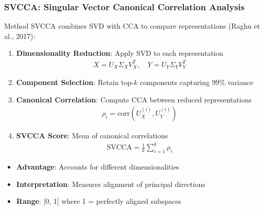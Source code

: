 \documentclass[aspectratio=1610, fontsize=8pt]{beamer}
\begin{document}
\begin{frame}
    \frametitle{SVCCA: Singular Vector Canonical Correlation Analysis}
    \begin{block}{Method}
        SVCCA combines SVD with CCA to compare representations (Raghu et al., 2017):
        
        \begin{enumerate}
            \item \textbf{Dimensionality Reduction}: Apply SVD to each representation
            \begin{align}
                X = U_X \Sigma_X V_X^T, \quad Y = U_Y \Sigma_Y V_Y^T
            \end{align}
            
            \item \textbf{Component Selection}: Retain top-$k$ components capturing 99\% variance
            
            \item \textbf{Canonical Correlation}: Compute CCA between reduced representations
            \begin{align}
                \rho_i = \text{corr}(U_X^{(i)}, U_Y^{(i)})
            \end{align}
            
            \item \textbf{SVCCA Score}: Mean of canonical correlations
            \begin{align}
                \text{SVCCA} = \frac{1}{k}\sum_{i=1}^{k} \rho_i
            \end{align}
        \end{enumerate}
    \end{block}
    
    \vspace{0.2cm}
    \begin{itemize}
        \item \textbf{Advantage}: Accounts for different dimensionalities
        \item \textbf{Interpretation}: Measures alignment of principal directions
        \item \textbf{Range}: [0, 1] where 1 = perfectly aligned subspaces
    \end{itemize}
\end{frame}
\end{document}

